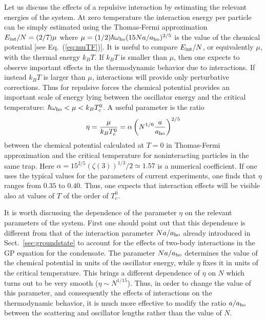 Let us discuss the effects of a repulsive interaction by estimating
the relevant energies of the system. At zero temperature the
interaction energy per particle can be simply estimated using the
Thomas-Fermi approximation $E_{\rm int}/N=(2/7)\mu$ where $\mu =(1/2) 
\hbar \omega_{\rm ho} (15Na/a_{\rm ho})^{2/5}$  is the value of the 
chemical potential [see Eq.~(\ref{eq:muTF})]. It is useful to 
compare $E_{\rm int}/N$, or equivalently $\mu$, with the thermal 
energy $k_BT$. If $k_BT$ is 
smaller than $\mu$, then one expects to observe important effects in the
thermodynamic behavior due to interactions. If instead $k_BT$ is larger
than $\mu$, interactions will provide only perturbative corrections.
Thus for repulsive forces the chemical potential provides an
important scale of energy lying  between the oscillator energy and
the critical temperature: $\hbar\omega_{\rm ho} < \mu < k_BT_c^0$.
A useful parameter is the ratio
\begin{equation}
\eta = \frac{\mu}{k_BT_c^0} = \alpha\left( N^{1/6}\frac{a}{a_{\rm ho}}
\right)^{2/5}
\label{eq:eta}
\end{equation}
between the chemical potential calculated at $T=0$ in Thomas-Fermi
approximation and the critical temperature for noninteracting particles in
the same trap. Here $\alpha=15^{2/5}(\zeta(3))^{1/3}/2\simeq 1.57$ is
a numerical coefficient.  If one uses the typical values for the
parameters of current experiments, one finds that $\eta$ ranges
from $0.35$ to $0.40$.  Thus,
one expects that interaction effects will be
visible also at values of $T$ of the order of $T_c^0$.

It is worth discussing the dependence of the parameter $\eta$ on the
relevant parameters of the system. First one should point out that this
dependence is different from that of the interaction
parameter $Na/a_{\rm ho}$ already introduced in Sect.~\ref{sec:groundstate}
to account for  the effects of two-body interactions in the GP equation
for the condensate. The parameter
$Na/a_{\rm ho}$ determines the value of the chemical potential in units
of the oscillator energy, while $\eta$ fixes it in units of
the critical temperature. This brings a different dependence of $\eta$ on
$N$ which turns out to be very smooth ($\eta \sim N^{1/15}$).
Thus, in order to change the value of this parameter, and consequently
the effects of interactions on the thermodynamic behavior, it is
much more effective to modify the ratio $a/a_{\rm ho}$ between the
scattering and  oscillator lengths rather than the value of $N$.

